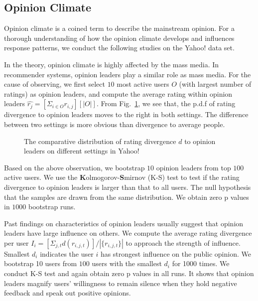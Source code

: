 \documentclass[sigconf]{acmart}
\begin{document}
 
 \subsection{Opinion Climate}
Opinion climate is a coined term to describe the mainstream opinion. For a thorough understanding of how the opinion climate develops and influences response patterns, we conduct the following studies on the Yahoo! data set.

In the theory, opinion climate is highly affected by the mass media. In recommender systems, opinion leaders play a similar role as mass media. For the cause of observing, we first select $10$ most active users $O$ (with largest number of ratings) as opinion leaders, and compute the average rating within opinion leaders $\hat{r_j}=[\Sigma_{i\in O}r_{i,j}][|O|]$. From Fig.~\ref{fig:leader}, we see that, the p.d.f of rating divergence to opinion leaders moves to the right in both settings. The difference between two settings is more obvious than divergence to average people. 

\begin{figure}[htbp]
\centering
\centering
{}
\caption{The comparative distribution of rating divergence $d$ to opinion leaders on different settings in Yahoo!}\label{fig:leader}
\end{figure}

Based on the above observation, we bootstrap $10$ opinion leaders from top $100$ active users. We use the \textbf{K}olmogorov-\textbf{S}mirnov (K-S) test to test if the rating divergence to opinion leaders is larger than that to all users. The null hypothesis that the samples are drawn from the same distribution. We obtain zero p values in $1000$ bootstrap runs. 

Past findings on characteristics of opinion leaders usually suggest that opinion leaders have large influence on others. We compute the  average rating divergence per user $I_i=[\Sigma_{j,t} d(r_{i,j,t})]/|\{r_{i,j,t}\}|$ to approach the strength of influence. Smallest $d_i$ indicates the user $i$ has strongest influence on the public opinion.  We bootstrap 10 users from $100$ users with the smallest $d_i$ for 1000 times. We conduct K-S test and again obtain zero p values in all runs. It shows that opinion leaders magnify users' willingness to remain silence when they hold negative feedback and speak out positive opinions.
\end{document}
